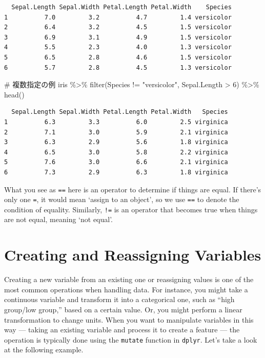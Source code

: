 \documentclass[
  a4paper,
]{book}
\newenvironment{Shaded}{\begin{snugshade}}{\end{snugshade}}
\newcommand{\CommentTok}[1]{\textcolor[rgb]{0.37,0.37,0.37}{#1}}
\newcommand{\DecValTok}[1]{\textcolor[rgb]{0.68,0.00,0.00}{#1}}
\newcommand{\FunctionTok}[1]{\textcolor[rgb]{0.28,0.35,0.67}{#1}}
\newcommand{\NormalTok}[1]{\textcolor[rgb]{0.00,0.23,0.31}{#1}}
\newcommand{\SpecialCharTok}[1]{\textcolor[rgb]{0.37,0.37,0.37}{#1}}
\newcommand{\StringTok}[1]{\textcolor[rgb]{0.13,0.47,0.30}{#1}}
\begin{document}
\begin{verbatim}
  Sepal.Length Sepal.Width Petal.Length Petal.Width    Species
1          7.0         3.2          4.7         1.4 versicolor
2          6.4         3.2          4.5         1.5 versicolor
3          6.9         3.1          4.9         1.5 versicolor
4          5.5         2.3          4.0         1.3 versicolor
5          6.5         2.8          4.6         1.5 versicolor
6          5.7         2.8          4.5         1.3 versicolor
\end{verbatim}

\begin{Shaded}
\begin{Highlighting}[]
\CommentTok{\# 複数指定の例}
\NormalTok{iris }\SpecialCharTok{\%\textgreater{}\%}
  \FunctionTok{filter}\NormalTok{(Species }\SpecialCharTok{!=} \StringTok{"versicolor"}\NormalTok{, Sepal.Length }\SpecialCharTok{\textgreater{}} \DecValTok{6}\NormalTok{) }\SpecialCharTok{\%\textgreater{}\%}
  \FunctionTok{head}\NormalTok{()}
\end{Highlighting}
\end{Shaded}

\begin{verbatim}
  Sepal.Length Sepal.Width Petal.Length Petal.Width   Species
1          6.3         3.3          6.0         2.5 virginica
2          7.1         3.0          5.9         2.1 virginica
3          6.3         2.9          5.6         1.8 virginica
4          6.5         3.0          5.8         2.2 virginica
5          7.6         3.0          6.6         2.1 virginica
6          7.3         2.9          6.3         1.8 virginica
\end{verbatim}

What you see as \texttt{==} here is an operator to determine if things
are equal. If there's only one \texttt{=}, it would mean `assign to an
object', so we use \texttt{==} to denote the condition of equality.
Similarly, \texttt{!=} is an operator that becomes true when things are
not equal, meaning `not equal'.

\section{Creating and Reassigning
Variables}\label{creating-and-reassigning-variables}

Creating a new variable from an existing one or reassigning values is
one of the most common operations when handling data. For instance, you
might take a continuous variable and transform it into a categorical
one, such as ``high group/low group,'' based on a certain value. Or, you
might perform a linear transformation to change units. When you want to
manipulate variables in this way --- taking an existing variable and
process it to create a feature --- the operation is typically done using
the \texttt{mutate} function in \texttt{dplyr}. Let's take a look at the
following example.
\end{document}
